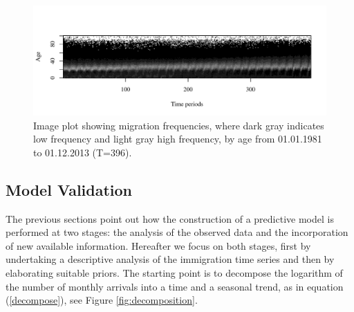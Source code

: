 \documentclass{article}\usepackage[]{graphicx}\usepackage[]{color}
\makeatletter
\def\maxwidth{ %
  \ifdim\Gin@nat@width>\linewidth
    \linewidth
  \else
    \Gin@nat@width
  \fi
}
\newenvironment{knitrout}{}{} %
\makeatother
\begin{document}
\begin{knitrout}
\color{fgcolor}\begin{figure}[!ht]
\includegraphics[width=\maxwidth]{figure/imageplot-1} \caption[Image plot showing migration frequencies, where dark gray indicates low frequency and light gray high frequency, by age from 01.01.1981 to 01.12.2013 (T=396)]{Image plot showing migration frequencies, where dark gray indicates low frequency and light gray high frequency, by age from 01.01.1981 to 01.12.2013 (T=396).}\label{fig:imageplot}
\end{figure}


\end{knitrout}



\subsection{Model Validation} \label{results}

The previous sections point out how the construction of a predictive model is performed at two stages: the analysis of the observed data and the incorporation of new available information. Hereafter we focus on both stages, first by undertaking a descriptive analysis of the immigration time series and then by elaborating suitable priors. 
The starting point is to decompose the logarithm of the number of monthly arrivals into a time and a seasonal trend, as in equation (\ref{decompose}), see Figure \ref{fig:decomposition}.
\end{document}
